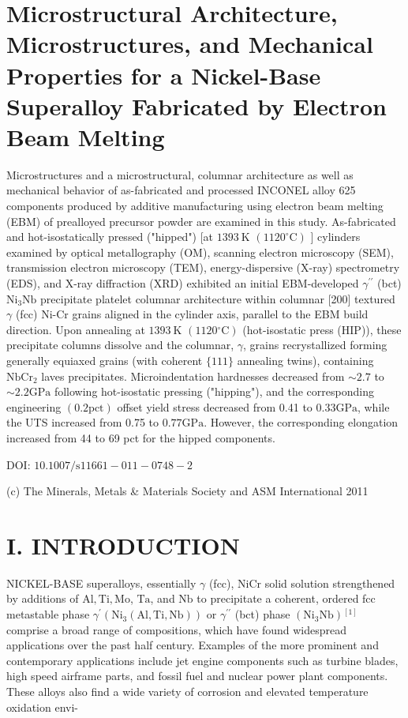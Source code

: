 \documentclass[10pt]{article}
\begin{document}
\section*{Microstructural Architecture, Microstructures, and Mechanical Properties for a Nickel-Base Superalloy Fabricated by Electron Beam Melting }
Microstructures and a microstructural, columnar architecture as well as mechanical behavior of as-fabricated and processed INCONEL alloy 625 components produced by additive manufacturing using electron beam melting (EBM) of prealloyed precursor powder are examined in this study. As-fabricated and hot-isostatically pressed ("hipped") [at $1393 \mathrm{~K}$ $\left(1120^{\circ} \mathrm{C}\right)$ ] cylinders examined by optical metallography (OM), scanning electron microscopy (SEM), transmission electron microscopy (TEM), energy-dispersive (X-ray) spectrometry (EDS), and X-ray diffraction (XRD) exhibited an initial EBM-developed $\gamma^{\prime \prime}$ (bct) $\mathrm{Ni}_{3} \mathrm{Nb}$ precipitate platelet columnar architecture within columnar [200] textured $\gamma$ (fcc) Ni-Cr grains aligned in the cylinder axis, parallel to the EBM build direction. Upon annealing at $1393 \mathrm{~K}$ $\left(1120{ }^{\circ} \mathrm{C}\right)$ (hot-isostatic press (HIP)), these precipitate columns dissolve and the columnar, $\gamma$, grains recrystallized forming generally equiaxed grains (with coherent $\{111\}$ annealing twins), containing $\mathrm{NbCr}_{2}$ laves precipitates. Microindentation hardnesses decreased from $\sim 2.7$ to $\sim 2.2 \mathrm{GPa}$ following hot-isostatic pressing ("hipping"), and the corresponding engineering $(0.2 \mathrm{pct})$ offset yield stress decreased from 0.41 to $0.33 \mathrm{GPa}$, while the UTS increased from 0.75 to $0.77 \mathrm{GPa}$. However, the corresponding elongation increased from 44 to 69 pct for the hipped components.

DOI: $10.1007 / \mathrm{s} 11661-011-0748-2$

(c) The Minerals, Metals \& Materials Society and ASM International 2011

\section*{I. INTRODUCTION}
NICKEL-BASE superalloys, essentially $\gamma$ (fcc), $\mathrm{NiCr}$ solid solution strengthened by additions of $\mathrm{Al}, \mathrm{Ti}, \mathrm{Mo}$, $\mathrm{Ta}$, and $\mathrm{Nb}$ to precipitate a coherent, ordered fcc metastable phase $\gamma^{\prime}\left(\mathrm{Ni}_{3}(\mathrm{Al}, \mathrm{Ti}, \mathrm{Nb})\right)$ or $\gamma^{\prime \prime}$ (bct) phase $\left(\mathrm{Ni}_{3} \mathrm{Nb}\right){ }^{[1]}$ comprise a broad range of compositions, which have found widespread applications over the past half century. Examples of the more prominent and contemporary applications include jet engine components such as turbine blades, high speed airframe parts, and fossil fuel and nuclear power plant components. These alloys also find a wide variety of corrosion and elevated temperature oxidation envi-
\end{document}
